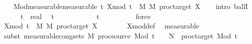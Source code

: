\begin{isabellebody}
\ \ \isamarkupfalse%
\ Mod{\isacharunderscore}{\kern0pt}measurable{\isacharbrackleft}{\kern0pt}measurable{\isacharbrackright}{\kern0pt}{\isacharcolon}{\kern0pt}\ {\isachardoublequoteopen}{\isasymforall}t{\isasymin}{\isacharbraceleft}{\kern0pt}{}{\isachardot}{\kern0pt}{\isachardot}{\kern0pt}{\isacharbraceright}{\kern0pt}{\isachardot}{\kern0pt}\ X{\isacharunderscore}{\kern0pt}mod\ t\ {\isasymin}\ {\isacharquery}{\kern0pt}M\ {\isasymrightarrow}\isactrlsub M\ proc{\isacharunderscore}{\kern0pt}target\ X{\isachardoublequoteclose}\isanewline
\ \ \isamarkupfalse%
\ {\isacharparenleft}{\kern0pt}intro\ ballI{\isacharparenright}{\kern0pt}\isanewline
\ \ \ \ \isamarkupfalse%
\ t\ {\isacharcolon}{\kern0pt}{\isacharcolon}{\kern0pt}\ real\ \isamarkupfalse%
\ {\isachardoublequoteopen}t\ {\isasymin}\ {\isacharbraceleft}{\kern0pt}{}{\isachardot}{\kern0pt}{\isachardot}{\kern0pt}{\isacharbraceright}{\kern0pt}{\isachardoublequoteclose}\isanewline
\ \ \ \ \isamarkupfalse%
\ \isamarkupfalse%
\ {\isachardoublequoteopen}{}\ {\isacharless}{\kern0pt}\ {\isasymlfloor}t\ {\isacharplus}{\kern0pt}\ {}{\isasymrfloor}{\isachardoublequoteclose}\isanewline
\ \ \ \ \ \ \isamarkupfalse%
\ force\isanewline
\ \ \ \ \isamarkupfalse%
\ \isamarkupfalse%
\ {\isachardoublequoteopen}X{\isacharunderscore}{\kern0pt}mod\ t\ {\isasymin}\ {\isacharquery}{\kern0pt}M\ {\isasymrightarrow}\isactrlsub M\ proc{\isacharunderscore}{\kern0pt}target\ X{\isachardoublequoteclose}\isanewline
\ \ \ \ \ \ \isamarkupfalse%
\ X{\isacharunderscore}{\kern0pt}mod{\isacharunderscore}{\kern0pt}def\ \isamarkupfalse%
\ measurable\isanewline
\ \ \ \ \ \ \ \ \isamarkupfalse%
\ {\isacharparenleft}{\kern0pt}subst\ measurable{\isacharunderscore}{\kern0pt}cong{\isacharunderscore}{\kern0pt}sets{\isacharbrackleft}{\kern0pt}\ M{\isacharprime}{\kern0pt}{\isacharequal}{\kern0pt}\ {\isachardoublequoteopen}proc{\isacharunderscore}{\kern0pt}source\ {\isacharparenleft}{\kern0pt}Mod\ {\isasymlfloor}t\ {\isacharplus}{\kern0pt}\ {}{\isasymrfloor}{\isacharparenright}{\kern0pt}{\isachardoublequoteclose}\ \ N{\isacharprime}{\kern0pt}\ {\isacharequal}{\kern0pt}\ {\isachardoublequoteopen}proc{\isacharunderscore}{\kern0pt}target\ {\isacharparenleft}{\kern0pt}Mod\ {\isasymlfloor}t\ {\isacharplus}{\kern0pt}\ {}{\isasymrfloor}{\isacharparenright}{\kern0pt}{\isachardoublequoteclose}{\isacharbrackright}{\kern0pt}{\isacharparenright}{\kern0pt}\isanewline

\end{isabellebody}
